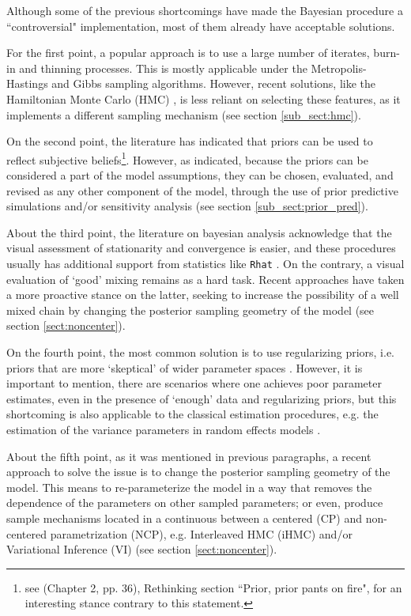 Although some of the previous shortcomings have made the Bayesian procedure a ``controversial" implementation, most of them already have acceptable solutions. 

For the first point, a popular approach is to use a large number of iterates, burn-in and thinning processes. This is mostly applicable under the Metropolis-Hastings and Gibbs sampling algorithms. However, recent solutions, like the Hamiltonian Monte Carlo (HMC) \cite{Betancourt_et_al_2013}, is less reliant on selecting these features, as it implements a different sampling mechanism (see section \ref{sub_sect:hmc}). 

On the second point, the literature has indicated that priors can be used to reflect subjective beliefs\footnote{see \citet{McElreath_2020} (Chapter 2, pp. 36), Rethinking section ``Prior, prior pants on fire", for an interesting stance contrary to this statement.}. However, as \citet{McElreath_2020} indicated, because the priors can be considered a part of the model assumptions, they can be chosen, evaluated, and revised as any other component of the model, through the use of prior predictive simulations and/or sensitivity analysis  (see section \ref{sub_sect:prior_pred}).

About the third point, the literature on bayesian analysis acknowledge that the visual assessment of stationarity and convergence is easier, and these procedures usually has additional support from statistics like \texttt{Rhat} \cite{Gelman_et_al_2014}. On the contrary, a visual evaluation of `good' mixing remains as a hard task. Recent approaches have taken a more proactive stance on the latter, seeking to increase the possibility of a well mixed chain by changing the posterior sampling geometry of the model \cite{Papaspiliopoulos_et_al_2003, Papaspiliopoulos_et_al_2007, Betancourt_et_al_2013, McElreath_2020} (see section \ref{sect:noncenter}).

On the fourth point, the most common solution is to use regularizing priors, i.e. priors that are more `skeptical' of wider parameter spaces \cite{McElreath_2020}. However, it is important to mention, there are scenarios where one achieves poor parameter estimates, even in the presence of `enough' data and regularizing priors, but this shortcoming is also applicable to the classical estimation procedures, e.g. the estimation of the variance parameters in random effects models \cite{Skrondal_et_al_2004a}.

About the fifth point, as it was mentioned in previous paragraphs, a recent approach to solve the issue is to change the posterior sampling geometry of the model. This means to re-parameterize the model in a way that removes the dependence of the parameters on other sampled parameters; or even, produce sample mechanisms located in a continuous between a centered (CP) and non-centered parametrization (NCP), e.g. Interleaved HMC (iHMC) and/or Variational Inference (VI) \cite{Gelfand_et_al_1995, Gelfand_et_al_1996, Papaspiliopoulos_et_al_2003, Papaspiliopoulos_et_al_2007, Betancourt_et_al_2013, Gorinova_et_al_2019} (see section \ref{sect:noncenter}).

